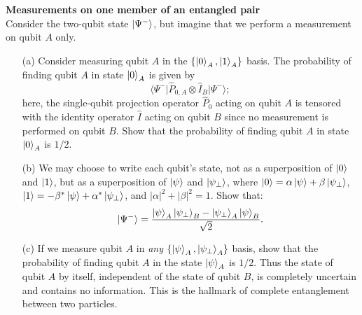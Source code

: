 \documentclass[12pt,letterpaper,boxed,cm]{hmcpset}
\newcommand{\abs}[1]{\left| #1 \right|}
\newcommand{\matelem}[3]{\big\langle #1\big\vert #2\big\vert #3\big\rangle}
\begin{document}
\begin{solution}
    \vfill
\end{solution}
\newpage

\begin{problem}[3.]
    \textbf{Measurements on one member of an entangled pair}\\
    Consider the two-qubit state $\ket{\Psi^-}$, but imagine that we perform a measurement on qubit $A$ only.
    \begin{enumerate}
        \item [(a)] Consider measuring qubit $A$ in the $\{\ket{0}_A,\ket{1}_A\}$ basis.  The probability of finding qubit $A$ in state $\ket{0}_A$ is given by
        \[
            \matelem{\Psi^-}{\hat{P}_{0,A} \otimes \hat{I}_B}{\Psi^-};
        \]
        here, the single-qubit projection operator $\hat{P}_{0}$ acting on qubit $A$ is tensored with the identity operator $\hat{I}$ acting on qubit $B$ since no measurement is performed on qubit $B$. Show that the probability of finding qubit $A$ in state $\ket{0}_A$ is $1/2$.
        \item [(b)] We may choose to write each qubit's state, not as a superposition of $\ket{0}$ and $\ket{1}$, but as a superposition of $\ket{\psi}$ and $\ket{\psi_\perp}$, where $\ket{0} = \alpha\ket{\psi} + \beta\ket{\psi_\perp}$, $\ket{1} = -\beta^*\ket{\psi} +\alpha^*\ket{\psi_\perp}$, and $\abs{\alpha}^2+\abs{\beta}^2 = 1$.  Show that:
        \[
            \ket{\Psi^-} = \frac{\ket{\psi}_A\ket{\psi_\perp}_B - \ket{\psi_\perp}_A\ket{\psi}_B}{\sqrt{2}}.
        \]
        \item [(c)] If we measure qubit $A$ in \textit{any} $\{\ket{\psi}_A,\ket{\psi_\perp}_A\}$ basis, show that the probability of finding qubit $A$ in the state $\ket{\psi}_A$ is $1/2$.  Thus the state of qubit $A$ by itself, independent of the state of qubit $B$, is completely uncertain and contains no information.  This is the hallmark of complete entanglement between two particles. 
    \end{enumerate}
\end{problem}

\begin{solution}
    
\end{solution}
\newpage
\end{document}
